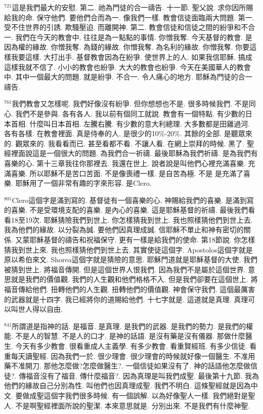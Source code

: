 \documentclass{book}
\begin{document}
$^{721}$這是我們最大的安慰.
第二.
祂為門徒的合一禱告.
十一節.
聖父說.
求你因所賜給我的命.
保守他們.
要他們合而為一.
像我們一樣.
教會信徒面臨兩大問題.
第一.
受不住世界的引誘.
欺騷壓迫.
而離開神.
第二.
教會信徒和信徒之間的紛爭和不合一.
我們在今天的教會中.
往往是為一點點的事情.
你憎我奪.
今天基督的教會.
是因為權的緣故.
你憎我奪.
為錢的緣故.
你憎我奪.
為名利的緣故.
你憎我奪.
你要這樣我要這樣.
大打出手.
基督教會因為在紛爭.
使世界上的人.
如果我信耶穌.
搞成這樣我就不信了.
小小的教會也紛爭.
大大的教會也紛爭.
今天在美國華人的教會中.
其中一個最大的問題.
就是紛爭.
不合一.
令人痛心的地方.
耶穌為門徒的合一禱告.

$^{761}$我們教會又怎樣呢.
我們好像沒有紛爭.
但你想想也不是.
很多時候我們.
不是同心.
我們不是參與.
各有各人.
我以前有個同工就說.
教會有一個特點.
有少數的日本首相.
什麼叫日本首相.
左騰右騰.
有少數的意大利總理.
大多數都是田雞過河.
各有各樣.
在教會裡面.
真是侍奉的人.
是很少的10\%-20\%.
其餘的全部.
是聽眾來的.
觀眾來的.
我看看而已.
甚至看都不看.
不讓人看.
在網上崇拜的時候.
黑了.
聖經裡面說這是一個很大的問題.
為我們合一祈禱.
最後耶穌為我們祈禱.
是為我們有喜樂的心.
第十三章我往你那裡去.
我還在世上.
說者說是叫他們心裡充滿喜樂.
充滿喜樂.
所以耶穌不是苦口苦面.
不是像喪禮一樣.
是自苦為極.
不是 是充滿了喜樂.
耶穌用了一個非常有趣的字來形容.
是Clero.

$^{801}$Clero這個字是滿到寫的.
基督徒有一個喜樂的心.
神賜給我們的喜樂.
是滿到寫的喜樂.
不是受環境支配的喜樂.
是內心的喜樂.
這是耶穌基督的祈禱.
最後我們看看18至19次.
耶穌猜險我們到世上.
你怎樣猜我到世上.
我也照樣猜他們到世上去.
我為他們的緣故.
以分裂為誠.
要他們因真理成誠.
信耶穌不單止和神有密切的關係.
又蒙耶穌基督的禱告和祝福保守.
更有一樣是給我們的使命.
第18節說.
你怎樣猜我到世上來.
我也照樣猜他們到世上去.
其實使徒這個字.
Apostolos這個字就是原以希伯來文.
Shorea這個字就是猜險的意思.
耶穌門道就是耶穌基督的大使.
我們被猜到世上.
將福音傳開.
但是這個世界人恨我們.
因為我們不是屬於這個世界.
意思就是我們的價值觀.
我們的人生觀和他們格格不入.
但是我們卻要在這個世上.
將福音傳給他們.
扭轉他們的人生觀.
扭轉他們的價值觀.
神會保守我們.
這個最厲害的武器就是十四字.
我已經將你的道賜給他們.
十七字就是.
這道就是真理.
真理可以叫世人得以自由.

$^{841}$所謂道是指神的話.
是福音.
是真理.
是我們的武器.
是我們的勢力.
是我們的權能.
不是人的智慧.
不是人的口才.
是神的話語.
是沒有藥是沒有儀器.
那做什麼醫生.
今天有多少教會.
很看重成人主義學.
有多少教會.
看重賢經班.
有多少信徒.
看重每天讀聖經.
因為我們一於.
很少理會.
很少理會的時候就好像一個醫生.
不准用藥不准開刀.
那他怎麼做?怎麼做醫生?.
一個信徒如果沒有了.
神的話語他怎麼做信徒?.
傳福音沒有了福音.
傳什麼福音?.
因為真理是叫我們成聖.
最後第十九節.
我為他們的緣故自己分別為性.
叫他們也因真理成聖.
我們不明白.
這條聖經就是因為中文.
要做成聖這個字我們很多時候.
有一個誤解.
以為好像聖人一樣.
我們絕對是聖人.
不是啊聖經裡面所說的聖潔.
本來意思就是.
分別出來.
不是我們有什麼神聖.
\end{document}
